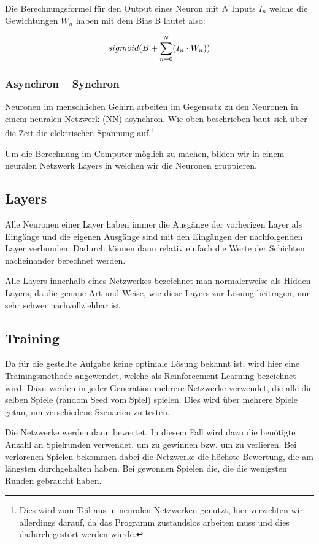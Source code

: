 \documentclass[11pt, twocolumn]{article}
\begin{document}
Die Berechnungsformel für den Output eines Neuron mit $N$ Inputs $I_n$ welche die Gewichtungen $W_n$ haben mit dem Bias B lautet also:

\begin{equation}
	\centering
	sigmoid(B + \sum_{n=0}^{N}(I_n \cdot W_n))
\end{equation}
 
\subsubsection{Asynchron – Synchron}
Neuronen im menschlichen Gehirn arbeiten im Gegensatz zu den Neuronen in einem neuralen Netzwerk (NN) asynchron. Wie oben beschrieben baut sich über die Zeit die elektrischen Spannung auf.\footnote{Dies wird zum Teil aus in neuralen Netzwerken genutzt, hier verzichten wir allerdings darauf, da das Programm zustandslos arbeiten muss und dies dadurch gestört werden würde.}

Um die Berechnung im Computer möglich zu machen, bilden wir in einem neuralen Netzwerk Layers in welchen wir die Neuronen gruppieren.


\subsection{Layers}
Alle Neuronen einer Layer haben immer die Ausgänge der vorherigen Layer als Eingänge und die eigenen Ausgänge sind mit den Eingängen der nachfolgenden Layer verbunden. Dadurch können dann relativ einfach die Werte der Schichten nacheinander berechnet werden.

Alle Layers innerhalb eines Netzwerkes bezeichnet man normalerweise als Hidden Layers, da die genaue Art und Weise, wie diese Layers zur Lösung beitragen, nur sehr schwer nachvollziehbar ist.


\subsection{Training}
Da für die gestellte Aufgabe keine optimale Lösung bekannt ist, wird hier eine Trainingsmethode angewendet, welche als Reinforcement-Learning bezeichnet wird. Dazu werden in jeder Generation mehrere Netzwerke verwendet, die alle die selben Spiele (random Seed vom Spiel) spielen. Dies wird über mehrere Spiele getan, um verschiedene Szenarien zu testen.

Die Netzwerke werden dann bewertet. In diesem Fall wird dazu die benötigte Anzahl an Spielrunden verwendet, um zu gewinnen bzw. um zu verlieren. Bei verlorenen Spielen bekommen dabei die Netzwerke die höchste Bewertung, die am längsten durchgehalten haben. Bei gewonnen Spielen die, die die wenigsten Runden gebraucht haben.
\end{document}

